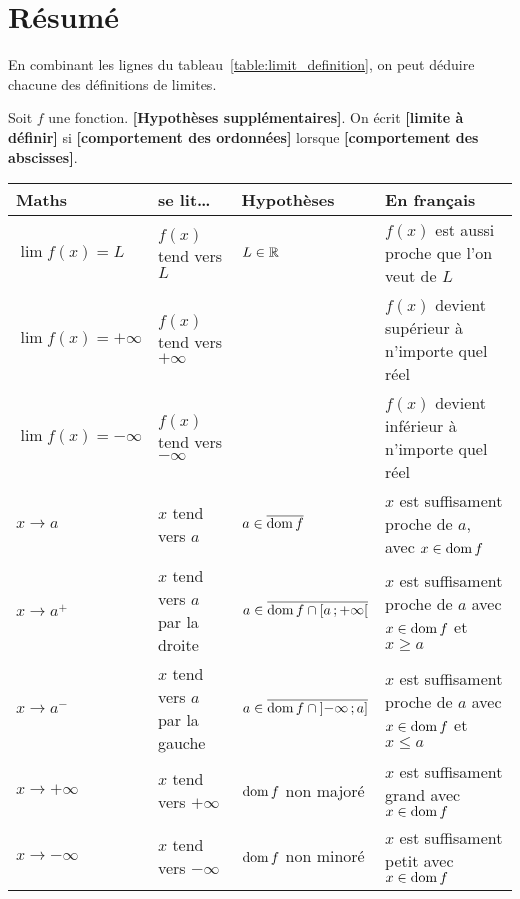 \documentclass[main.tex]{subfiles}
\begin{document}
\section{Résumé}

En combinant les lignes du tableau~\ref{table:limit_definition},
on peut déduire chacune des définitions de limites.

\begin{definition}
    [Limite]

    Soit $f$ une fonction.
    \textbf{[Hypothèses supplémentaires]}.
    On écrit \textbf{[limite à définir]}
    si \textbf{[comportement des ordonnées]}
    lorsque \textbf{[comportement des abscisses]}.
\end{definition}

\begin{sidewaystable}
    \centering
    \caption{Tableau récapitulatif pour les définitions de limite}\label{table:limit_definition}
    \begin{tabular}
        {l l l l}
        \toprule
        Maths & se lit\dots & Hypothèses & En français \\ \midrule
        $\lim f(x) = L$ & $f(x)$ tend vers $L$ & $L \in \mathbb{R}$ & $f(x)$ est aussi proche que l'on veut de $L$ \\
        $\lim f(x) = +\infty$ & $f(x)$ tend vers $+\infty$ & & $f(x)$ devient supérieur à n'importe quel réel\\
        $\lim f(x) = -\infty$ & $f(x)$ tend vers $-\infty$ & & $f(x)$ devient inférieur à n'importe quel réel\\
        $x \to a$ & $x$ tend vers $a$ & $a \in \overline{\operatorname{dom} f}$ & $x$ est suffisament proche de $a$, avec $x \in \operatorname{dom} f$\\
        $x \to a^+$ & $x$ tend vers $a$ par la droite & $a \in \overline{\operatorname{dom} f \cap \mathopen{[}a\,;+\infty\mathclose{[}}$ & $x$ est suffisament proche de $a$ avec $x \in \operatorname{dom} f$ et $x \geq a$\\
        $x \to a^-$ & $x$ tend vers $a$ par la gauche & $a \in \overline{\operatorname{dom} f \cap \mathopen{]}-\infty\,;a\mathclose{]}}$ & $x$ est suffisament proche de $a$ avec $x \in \operatorname{dom} f$ et $x \leq a$\\
        $x \to +\infty$ & $x$ tend vers $+\infty$ & $\operatorname{dom} f$ non majoré & $x$ est suffisament grand avec $x \in \operatorname{dom} f$\\
        $x \to -\infty$ & $x$ tend vers $-\infty$ & $\operatorname{dom} f$ non minoré & $x$ est suffisament petit avec $x \in \operatorname{dom} f$\\
        \bottomrule
    \end{tabular}
\end{sidewaystable}
\end{document}
